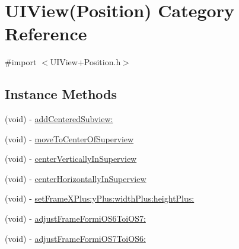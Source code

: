 \hypertarget{category_u_i_view_07_position_08}{\section{U\+I\+View(Position) Category Reference}
\label{category_u_i_view_07_position_08}
}


{\ttfamily \#import $<$U\+I\+View+\+Position.\+h$>$}

\subsection*{Instance Methods}
\begin{DoxyCompactItemize}
\item 
(void) -\/ \hyperlink{category_u_i_view_07_position_08_a4ab53ef69f304fba4732aeb9256b5ee0}{add\+Centered\+Subview\+:}
\item 
(void) -\/ \hyperlink{category_u_i_view_07_position_08_afaae9a5b1741fa3eb2ae7c57cf4687d8}{move\+To\+Center\+Of\+Superview}
\item 
(void) -\/ \hyperlink{category_u_i_view_07_position_08_a3ede327c32904e3e1e9e5c90b6cd8071}{center\+Vertically\+In\+Superview}
\item 
(void) -\/ \hyperlink{category_u_i_view_07_position_08_a50aabdd38d9ff4e017bc0238e2346ae2}{center\+Horizontally\+In\+Superview}
\item 
(void) -\/ \hyperlink{category_u_i_view_07_position_08_aee174d95a8088008dd006205fad44d17}{set\+Frame\+X\+Plus\+:y\+Plus\+:width\+Plus\+:height\+Plus\+:}
\item 
(void) -\/ \hyperlink{category_u_i_view_07_position_08_a3f7385a31ead16eb46e759a413aa9f19}{adjust\+Frame\+Formi\+O\+S6\+Toi\+O\+S7\+:}
\item 
(void) -\/ \hyperlink{category_u_i_view_07_position_08_a26680d798543876e3d295c69ecf7f35c}{adjust\+Frame\+Formi\+O\+S7\+Toi\+O\+S6\+:}
\end{DoxyCompactItemize}
